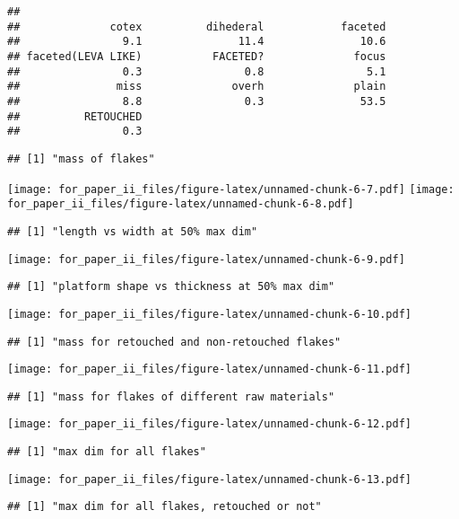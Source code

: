 \documentclass[]{article}
\begin{document}
\begin{verbatim}
## 
##              cotex          dihederal            faceted 
##                9.1               11.4               10.6 
## faceted(LEVA LIKE)           FACETED?              focus 
##                0.3                0.8                5.1 
##               miss              overh              plain 
##                8.8                0.3               53.5 
##          RETOUCHED 
##                0.3
\end{verbatim}

\begin{verbatim}
## [1] "mass of flakes"
\end{verbatim}

\texttt{[image: for\_paper\_ii\_files/figure-latex/unnamed-chunk-6-7.pdf]}
\texttt{[image: for\_paper\_ii\_files/figure-latex/unnamed-chunk-6-8.pdf]}

\begin{verbatim}
## [1] "length vs width at 50% max dim"
\end{verbatim}

\texttt{[image: for\_paper\_ii\_files/figure-latex/unnamed-chunk-6-9.pdf]}

\begin{verbatim}
## [1] "platform shape vs thickness at 50% max dim"
\end{verbatim}

\texttt{[image: for\_paper\_ii\_files/figure-latex/unnamed-chunk-6-10.pdf]}

\begin{verbatim}
## [1] "mass for retouched and non-retouched flakes"
\end{verbatim}

\texttt{[image: for\_paper\_ii\_files/figure-latex/unnamed-chunk-6-11.pdf]}

\begin{verbatim}
## [1] "mass for flakes of different raw materials"
\end{verbatim}

\texttt{[image: for\_paper\_ii\_files/figure-latex/unnamed-chunk-6-12.pdf]}

\begin{verbatim}
## [1] "max dim for all flakes"
\end{verbatim}

\texttt{[image: for\_paper\_ii\_files/figure-latex/unnamed-chunk-6-13.pdf]}

\begin{verbatim}
## [1] "max dim for all flakes, retouched or not"
\end{verbatim}
\end{document}

